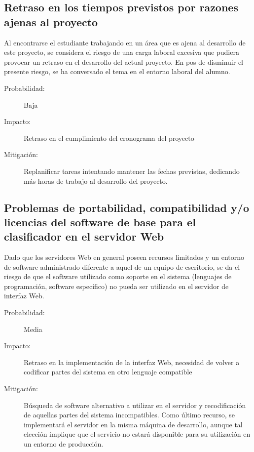 \documentclass[12pt,bibliography=oldstyle,DIV=12,parskip=full-,titlepage]{scrartcl}
\begin{document}
\subsection{Retraso en los tiempos previstos por razones ajenas al proyecto}
Al encontrarse el estudiante trabajando en un área que es ajena al
desarrollo de este proyecto, se considera el riesgo de una carga
laboral excesiva que pudiera provocar un retraso en el desarrollo del
actual proyecto. En pos de disminuir el presente riesgo, se ha
conversado el tema en el entorno laboral del alumno.
\begin{description}
  \item[Probabilidad:] Baja
  \item[Impacto:] Retraso en el cumplimiento del cronograma del
    proyecto
  \item[Mitigación:] Replanificar tareas intentando mantener las
    fechas previstas, dedicando más horas de trabajo al desarrollo del
    proyecto.
\end{description}
%
\subsection{Problemas de portabilidad, compatibilidad y/o
  licencias del software de base para el clasificador en el servidor Web}
Dado que los servidores Web en general poseen recursos limitados y un
entorno de software administrado diferente a aquel de un equipo de
escritorio, se da el riesgo de que el software utilizado como soporte
en el sistema (lenguajes de programación, software específico) no
pueda ser utilizado en el servidor de interfaz Web.
\begin{description}
  \item[Probabilidad:] Media
  \item[Impacto:] Retraso en la implementación de la interfaz Web,
    necesidad de volver a codificar partes del sistema en otro
    lenguaje compatible
  \item[Mitigación:] Búsqueda de software alternativo a utilizar en el
    servidor y recodificación de aquellas partes del sistema
    incompatibles. Como último recurso, se implementará el servidor en
    la misma máquina de desarrollo, aunque tal elección implique que
    el servicio no estará disponible para su utilización en un entorno
    de producción.
\end{description}
%
%
\end{document}
